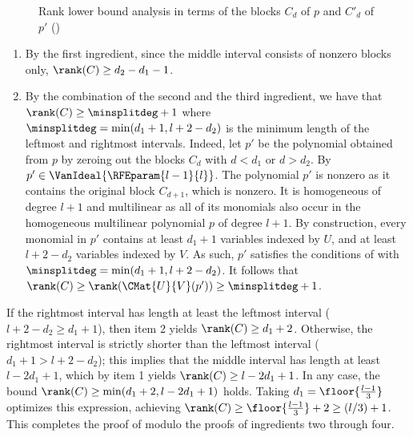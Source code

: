 \begin{figure}
\begin{center}
\end{center}
\caption{Rank lower bound analysis in terms of the blocks $C_d$ of $p$ and $C'_d$ of $p'$ ()}\label{fig.roabp}
\end{figure}
\begin{enumerate}
  \item By the first ingredient, since the middle interval consists of nonzero blocks only, $\rank(C) \ge d_2-d_1-1$.
  \item By the combination of the second and the third ingredient, we have that $\rank(C) \ge \minsplitdeg+1$
    where $\minsplitdeg = \min(d_1+1,l+2-d_2)$ is the minimum length of the leftmost and rightmost intervals.
    Indeed, let $p'$ be the polynomial obtained from $p$ by zeroing out the blocks $C_d$ with $d < d_1$ or $d > d_2$. By  $p' \in \VanIdeal{\RFEparam{l-1}{l}}$. The polynomial $p'$ is nonzero as it contains the original block $C_{d+1}$, which is nonzero. It is homogeneous of degree $l+1$ and multilinear as all of its monomials also occur in the homogeneous multilinear polynomial $p$ of degree $l+1$. By construction, every monomial in $p'$ contains at least $d_1+1$ variables indexed by $U$, and at least $l+2-d_2$ variables indexed by $V$. As such, $p'$ satisfies the conditions of  with $\minsplitdeg = \min(d_1+1,l+2-d_2)$. It follows that $\rank(C) \ge \rank(\CMat{U}{V}(p')) \ge \minsplitdeg+1$.
\end{enumerate}
If the rightmost interval has length at least the leftmost interval ($l+2-d_2 \ge d_1+1$),
then item 2 yields $\rank(C) \ge d_1+2$.
Otherwise, the rightmost interval is strictly shorter than the leftmost interval
($d_1+1 > l+2-d_2$);
this implies that the middle interval has length at least \(l - 2d_1 + 1\),
which by item 1 yields $\rank(C) \ge l-2d_1+1$.
In any case, the bound $\rank(C) \ge \min(d_1+2,l-2d_1+1)$ holds.
Taking $d_1= \floor{\frac{l-1}{3}}$ optimizes this expression,
achieving $\rank(C) \ge \floor{\frac{l-1}{3}} + 2 \ge (l/3)+1$.
This completes the proof of  modulo the
proofs of ingredients two through four.

